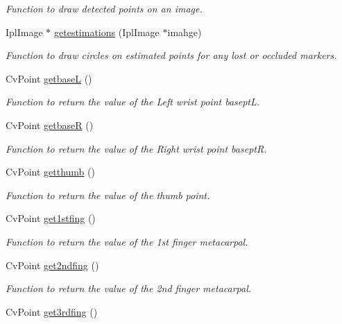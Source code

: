 \begin{DoxyCompactItemize}
\begin{DoxyCompactList}\small\item\em Function to draw detected points on an image. \end{DoxyCompactList}\item 
IplImage $\ast$ \hyperlink{classFullhand_a66c4f8020b5319a7002872045515251e}{getestimations} (IplImage $\ast$imahge)
\begin{DoxyCompactList}\small\item\em Function to draw circles on estimated points for any lost or occluded markers. \end{DoxyCompactList}\item 
CvPoint \hyperlink{classFullhand_ab9c7d8f54b1363adcd7b0902c0dbf4cf}{getbaseL} ()
\begin{DoxyCompactList}\small\item\em Function to return the value of the Left wrist point baseptL. \end{DoxyCompactList}\item 
CvPoint \hyperlink{classFullhand_a3381b5876d560c2f7dec7e6412f346ca}{getbaseR} ()
\begin{DoxyCompactList}\small\item\em Function to return the value of the Right wrist point baseptR. \end{DoxyCompactList}\item 
CvPoint \hyperlink{classFullhand_ab99327b3ecd306053d22e03bf8feaeb8}{getthumb} ()
\begin{DoxyCompactList}\small\item\em Function to return the value of the thumb point. \end{DoxyCompactList}\item 
CvPoint \hyperlink{classFullhand_ac5b2aa60280868b01d6c0d43f31d233a}{get1stfing} ()
\begin{DoxyCompactList}\small\item\em Function to return the value of the 1st finger metacarpal. \end{DoxyCompactList}\item 
CvPoint \hyperlink{classFullhand_a65b3f12b6d4300750ee55b7e819692ea}{get2ndfing} ()
\begin{DoxyCompactList}\small\item\em Function to return the value of the 2nd finger metacarpal. \end{DoxyCompactList}\item 
CvPoint \hyperlink{classFullhand_aeeac350d43d6ecda41bfb79d6855e5bd}{get3rdfing} ()

\end{DoxyCompactItemize}
